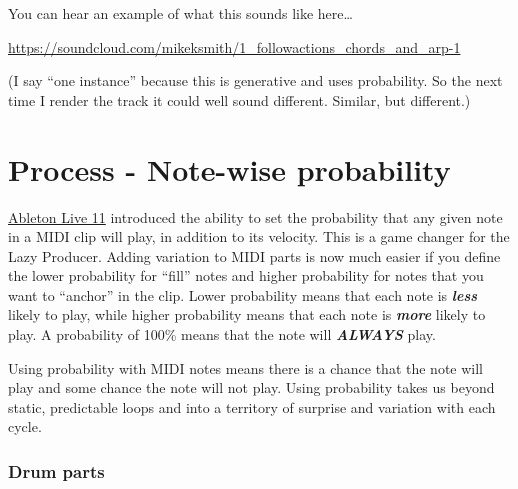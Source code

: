\documentclass[
  12pt,
  letterpaper,
  oneside,
  open=any]{scrbook}
\begin{document}
You can hear an example of what this sounds like here\ldots{}

\url{https://soundcloud.com/mikeksmith/1_followactions_chords_and_arp-1}

(I say ``one instance'' because this is generative and uses probability.
So the next time I render the track it could well sound different.
Similar, but different.)


\chapter{Process - Note-wise
probability}\label{Chapter-002-Process-Note_wise_probability}

\href{https://www.ableton.com/en/live-manual/11/welcome-to-live/\#welcome-to-live}{Ableton
Live 11} introduced the ability to set the probability that any given
note in a MIDI clip will play, in addition to its velocity. This is a
game changer for the Lazy Producer. Adding variation to MIDI parts is
now much easier if you define the lower probability for ``fill'' notes
and higher probability for notes that you want to ``anchor'' in the
clip. Lower probability means that each note is \textbf{\emph{less}}
likely to play, while higher probability means that each note is
\textbf{\emph{more}} likely to play. A probability of 100\% means that
the note will \textbf{\emph{ALWAYS}} play.

\begin{tcolorbox}[enhanced jigsaw, breakable, left=2mm, leftrule=.75mm, toprule=.15mm, opacitybacktitle=0.6, toptitle=1mm, coltitle=black, colback=white, colbacktitle=quarto-callout-tip-color!10!white, opacityback=0, rightrule=.15mm, bottomrule=.15mm, titlerule=0mm, title=\textcolor{quarto-callout-tip-color}{\faLightbulb}\hspace{0.5em}{Key idea}, arc=.35mm, bottomtitle=1mm, colframe=quarto-callout-tip-color-frame]

Using probability with MIDI notes means there is a chance that the note
will play and some chance the note will not play. Using probability
takes us beyond static, predictable loops and into a territory of
surprise and variation with each cycle.

\end{tcolorbox}

\subsection{Drum parts}\label{drum-parts}
\end{document}
